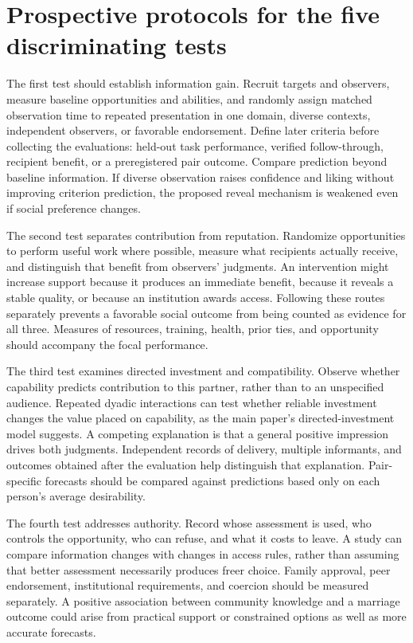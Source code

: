 \section{Prospective protocols for the five discriminating tests}\label{sec:minds-protocols}

The first test should establish information gain. Recruit targets and observers, measure baseline opportunities and abilities, and randomly assign matched observation time to repeated presentation in one domain, diverse contexts, independent observers, or favorable endorsement. Define later criteria before collecting the evaluations: held-out task performance, verified follow-through, recipient benefit, or a preregistered pair outcome. Compare prediction beyond baseline information. If diverse observation raises confidence and liking without improving criterion prediction, the proposed reveal mechanism is weakened even if social preference changes.

The second test separates contribution from reputation. Randomize opportunities to perform useful work where possible, measure what recipients actually receive, and distinguish that benefit from observers' judgments. An intervention might increase support because it produces an immediate benefit, because it reveals a stable quality, or because an institution awards access. Following these routes separately prevents a favorable social outcome from being counted as evidence for all three. Measures of resources, training, health, prior ties, and opportunity should accompany the focal performance.

The third test examines directed investment and compatibility. Observe whether capability predicts contribution to this partner, rather than to an unspecified audience. Repeated dyadic interactions can test whether reliable investment changes the value placed on capability, as the main paper's directed-investment model suggests. A competing explanation is that a general positive impression drives both judgments. Independent records of delivery, multiple informants, and outcomes obtained after the evaluation help distinguish that explanation. Pair-specific forecasts should be compared against predictions based only on each person's average desirability.

The fourth test addresses authority. Record whose assessment is used, who controls the opportunity, who can refuse, and what it costs to leave. A study can compare information changes with changes in access rules, rather than assuming that better assessment necessarily produces freer choice. Family approval, peer endorsement, institutional requirements, and coercion should be measured separately. A positive association between community knowledge and a marriage outcome could arise from practical support or constrained options as well as more accurate forecasts.

